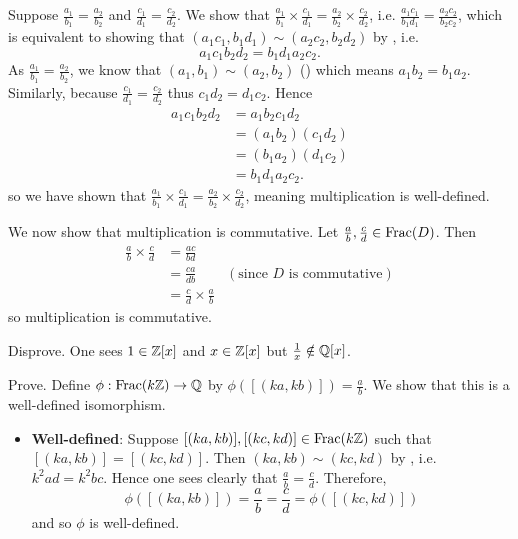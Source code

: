 \begin{questions}
    \item Suppose $\frac{a_1}{b_1} = \frac{a_2}{b_2}$ and $\frac{c_1}{d_1} = \frac{c_2}{d_2}$. We show that $\frac{a_1}{b_1} \times \frac{c_1}{d_1} = \frac{a_2}{b_2} \times \frac{c_2}{d_2}$, i.e. $\frac{a_1c_1}{b_1d_1} = \frac{a_2c_2}{b_2c_2}$, which is equivalent to showing that $(a_1c_1, b_1d_1) \mathrel{\sim} (a_2c_2, b_2d_2)$ by , i.e.
    \[
        a_1c_1b_2d_2 = b_1d_1a_2c_2.
    \]
    As $\frac{a_1}{b_1} = \frac{a_2}{b_2}$, we know that $(a_1, b_1) \mathrel{\sim} (a_2, b_2)$ () which means $a_1b_2 = b_1a_2$. Similarly, because $\frac{c_1}{d_1} = \frac{c_2}{d_2}$ thus $c_1d_2 = d_1c_2$. Hence
    \begin{align*}
        a_1c_1b_2d_2 &= a_1b_2c_1d_2\\
        &= (a_1b_2)(c_1d_2)\\
        &= (b_1a_2)(d_1c_2)\\
        &= b_1d_1a_2c_2.
    \end{align*}
    so we have shown that $\frac{a_1}{b_1} \times \frac{c_1}{d_1} = \frac{a_2}{b_2} \times \frac{c_2}{d_2}$, meaning multiplication is well-defined.

    We now show that multiplication is commutative. Let $\frac ab, \frac cd \in \mathrm{Frac}(D)$. Then
    \begin{align*}
        \frac ab \times \frac cd &= \frac{ac}{bd}\\
        &= \frac{ca}{db} & (\text{since } D \text{ is commutative})\\
        &= \frac cd \times \frac ab
    \end{align*}
    so multiplication is commutative.

    \item \begin{partquestions}{\alph*}
        \item Disprove. One sees $1 \in \mathbb{Z}[x]$ and $x \in \mathbb{Z}[x]$ but $\frac1x \notin \mathbb{Q}[x]$.
        
        \item Prove. Define $\phi: \mathrm{Frac}(k\mathbb{Z}) \to \mathbb{Q}$ by $\phi([(ka, kb)]) = \frac ab$. We show that this is a well-defined isomorphism.
        \begin{itemize}
            \item \textbf{Well-defined}: Suppose $[(ka, kb)], [(kc, kd)] \in \mathrm{Frac}(k\mathbb{Z})$ such that $[(ka,kb)]=[(kc,kd)]$. Then $(ka, kb) \mathrel{\sim} (kc, kd)$ by , i.e. $k^2ad = k^2bc$. Hence one sees clearly that $\frac ab = \frac cd$. Therefore,
            \[
                \phi([(ka,kb)]) = \frac ab = \frac cd = \phi([(kc, kd)])
            \]
            and so $\phi$ is well-defined.
            

\end{itemize}
\end{partquestions}
\end{questions}
